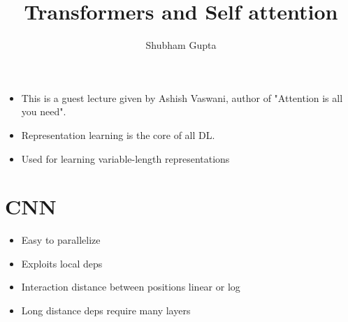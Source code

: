 \documentclass[a4paper]{article}
\title{Transformers and Self attention}
\author{Shubham Gupta}
\begin{document}
\maketitle
\begin{itemize}
    \item This is a guest lecture given by Ashish Vaswani, author of "Attention is all you need".
    \item Representation learning is the core of all DL. 
    \item Used for learning variable-length representations
\end{itemize}
\section{CNN}
\begin{itemize}
    \item Easy to parallelize
    \item Exploits local deps
    \item Interaction distance between positions linear or log
    \item Long distance deps require many layers
\end{itemize}
\end{document}
